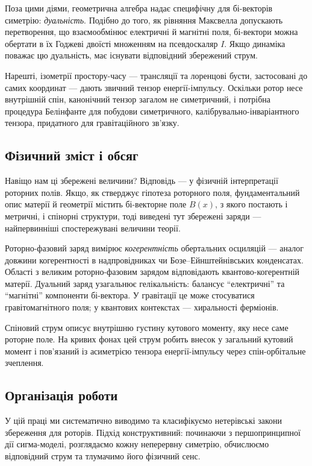 \documentclass[11pt,a4paper]{article}
\numberwithin{equation}{section}
\theoremstyle{plain}
\theoremstyle{definition}
\theoremstyle{remark}
\begin{document}
Поза цими діями, геометрична алгебра надає специфічну для бі-векторів симетрію: \emph{дуальність}. Подібно до того, як рівняння Максвелла допускають перетворення, що взаємообмінює електричні й магнітні поля, бі-вектори можна обертати в їх Годжеві двоїсті множенням на псевдоскаляр $I$. Якщо динаміка поважає цю дуальність, має існувати відповідний збережений струм.

Нарешті, ізометрії простору-часу — трансляції та лоренцові бусти, застосовані до самих координат — дають звичний тензор енергії-імпульсу. Оскільки ротор несе внутрішній спін, канонічний тензор загалом не симетричний, і потрібна процедура Белінфанте для побудови симетричного, калібрувально-інваріантного тензора, придатного для гравітаційного зв’язку.

\subsection{Фізичний зміст і обсяг}

Навіщо нам ці збережені величини? Відповідь — у фізичній інтерпретації роторних полів. Якщо, як стверджує гіпотеза роторного поля, фундаментальний опис матерії й геометрії містить бі-векторне поле $B(x)$, з якого постають і метричні, і спінорні структури, тоді виведені тут збережені заряди — найпервинніші спостережувані величини теорії.

Роторно-фазовий заряд вимірює \emph{когерентність} обертальних осциляцій — аналог довжини когерентності в надпровідниках чи Бозе–Ейнштейнівських конденсатах. Області з великим роторно-фазовим зарядом відповідають квантово-когерентній матерії. Дуальний заряд узагальнює гелікальність: балансує “електричні” та “магнітні” компоненти бі-вектора. У гравітації це може стосуватися гравітомагнітного поля; у квантових контекстах — хиральності ферміонів.

Спіновий струм описує внутрішню густину кутового моменту, яку несе саме роторне поле. На кривих фонах цей струм робить внесок у загальний кутовий момент і пов’язаний із асиметрією тензора енергії-імпульсу через спін-орбітальне зчеплення.

\subsection{Організація роботи}

У цій праці ми систематично виводимо та класифікуємо нетерівські закони збереження для роторів. Підхід конструктивний: починаючи з першопринципної дії сигма-моделі, розглядаємо кожну неперервну симетрію, обчислюємо відповідний струм та тлумачимо його фізичний сенс.
\end{document}
